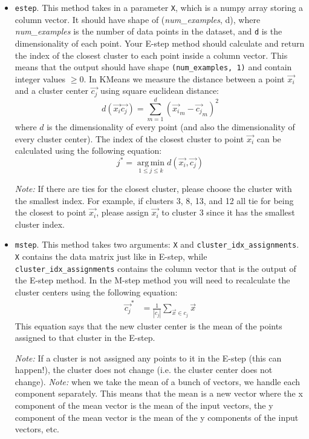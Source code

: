\documentclass[11pt]{article}
\DeclareMathOperator*{\argmin}{arg\,min}
\begin{document}
\begin{itemize}
    \item\texttt{estep}. This method takes in a parameter \texttt{X}, which is a numpy array storing a column vector.
    It should have shape of (\textit{num\_examples}, d), where \textit{num\_examples} is the number of data points in the dataset, and \texttt{d} is the dimensionality of each point.
    Your E-step method should calculate and return the index of the closest cluster to each point inside a column vector. This means that the output should have shape \texttt{(num\_examples, 1)} and contain integer values $\ge 0$.
    In KMeans we measure the distance between a point $\vec{x_i}$ and a cluster center $\vec{c_j}$ using square euclidean distance:
$$d(\vec{x_i} \vec{c_j}) = \sum\limits_{m=1}^d (\vec{x_i}_m - \vec{c_j}_m)^2$$
where $d$ is the dimensionality of every point (and also the dimensionality of every cluster center). The index of the closest cluster to point $\vec{x_i}$ can be calculated using the following equation:
$$j^* = \argmin\limits_{1\le j\le k} d(\vec{x_i}, \vec{c_j})$$

\noindent \textit{Note:} If there are ties for the closest cluster, please choose the cluster with the smallest index. For example, if clusters 3, 8, 13, and 12 all tie for being the closest to point $\vec{x_i}$,
please assign $\vec{x_i}$ to cluster 3 since it has the smallest cluster index.

    \item\texttt{mstep}. This method takes two arguments: \texttt{X} and \texttt{cluster\_idx\_assignments}. \texttt{X} contains the data matrix just like in E-step, while \texttt{cluster\_idx\_assignments} contains
    the column vector that is the output of the E-step method. In the M-step method you will need to recalculate the cluster centers using the following equation:
\begin{align*}
    \vec{c_j}^*        &= \frac{1}{|c_j|}\sum\limits_{\vec{x}\in c_j} \vec{x}
\end{align*}
This equation says that the new cluster center is the mean of the points assigned to that cluster in the E-step.

\noindent\textit{Note:} If a cluster is not assigned any points to it in the E-step (this can happen!), the cluster does not change (i.e. the cluster center does not change).\newline
\noindent\textit{Note:} when we take the mean of a bunch of vectors, we handle each component separately. This means that the mean is a new vector where the x component of the mean vector is the mean of the input vectors,
the y component of the mean vector is the mean of the y components of the input vectors, etc.

\end{itemize}
\end{document}
